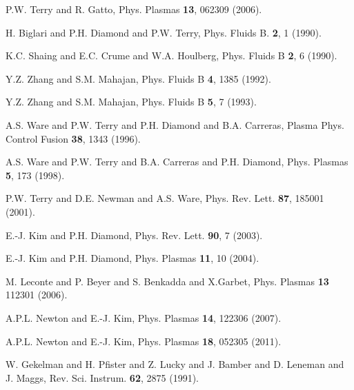 \documentclass[aip,pop,amsmath,amssymb,reprint,superscriptaddress]{revtex4-1} %
\begin{document}
\begin{thebibliography}{10}
P.W. Terry and R. Gatto, Phys. Plasmas {\bf 13}, 062309 (2006).

H. Biglari and P.H. Diamond and P.W. Terry, Phys. Fluids B. {\bf 2},  1  (1990).

K.C. Shaing and E.C. Crume and W.A. Houlberg, Phys. Fluids B {\bf 2}, 6 (1990).

Y.Z. Zhang and S.M. Mahajan, Phys. Fluids B {\bf 4}, 1385 (1992).

Y.Z. Zhang and S.M. Mahajan, Phys. Fluids B {\bf 5}, 7 (1993).

A.S. Ware and P.W. Terry and P.H. Diamond and B.A. Carreras, Plasma Phys. Control Fusion {\bf 38},  1343  (1996).

A.S. Ware and P.W. Terry and B.A. Carreras and P.H. Diamond, Phys. Plasmas {\bf 5}, 173 (1998).

P.W. Terry and D.E. Newman and A.S. Ware, Phys. Rev. Lett. {\bf 87}, 185001  (2001).

E.-J. Kim and P.H. Diamond, Phys. Rev. Lett. {\bf 90}, 7 (2003).

E.-J. Kim and P.H. Diamond, Phys. Plasmas {\bf 11},  10  (2004).

M. Leconte and P. Beyer and S. Benkadda and X.Garbet, Phys. Plasmas {\bf 13} 112301 (2006).

A.P.L. Newton and E.-J. Kim, Phys. Plasmas {\bf 14}, 122306 (2007).

A.P.L. Newton and E.-J. Kim, Phys. Plasmas {\bf 18}, 052305 (2011).

W. Gekelman and H. Pfister and Z. Lucky and J. Bamber and D. Leneman and J. Maggs, Rev. Sci. Instrum. {\bf 62},  2875  (1991).







\end{thebibliography}
\end{document}
